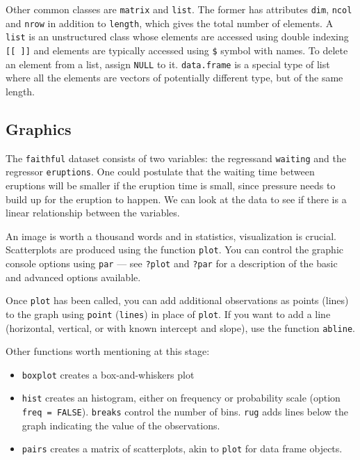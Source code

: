 \documentclass[]{book}
\providecommand{\tightlist}{%
  \setlength{\itemsep}{0pt}\setlength{\parskip}{0pt}}
\begin{document}
Other common classes are \texttt{matrix} and \texttt{list}. The former
has attributes \texttt{dim}, \texttt{ncol} and \texttt{nrow} in addition
to \texttt{length}, which gives the total number of elements. A
\texttt{list} is an unstructured class whose elements are accessed using
double indexing \texttt{{[}{[}\ {]}{]}} and elements are typically
accessed using \texttt{\$} symbol with names. To delete an element from
a list, assign \texttt{NULL} to it. \texttt{data.frame} is a special
type of list where all the elements are vectors of potentially different
type, but of the same length.

\subsection{Graphics}\label{graphics}

The \texttt{faithful} dataset consists of two variables: the regressand
\texttt{waiting} and the regressor \texttt{eruptions}. One could
postulate that the waiting time between eruptions will be smaller if the
eruption time is small, since pressure needs to build up for the
eruption to happen. We can look at the data to see if there is a linear
relationship between the variables.

An image is worth a thousand words and in statistics, visualization is
crucial. Scatterplots are produced using the function \texttt{plot}. You
can control the graphic console options using \texttt{par} --- see
\texttt{?plot} and \texttt{?par} for a description of the basic and
advanced options available.

Once \texttt{plot} has been called, you can add additional observations
as points (lines) to the graph using \texttt{point} (\texttt{lines}) in
place of \texttt{plot}. If you want to add a line (horizontal, vertical,
or with known intercept and slope), use the function \texttt{abline}.

Other functions worth mentioning at this stage:

\begin{itemize}
\tightlist
\item
  \texttt{boxplot} creates a box-and-whiskers plot
\item
  \texttt{hist} creates an histogram, either on frequency or probability
  scale (option \texttt{freq\ =\ FALSE}). \texttt{breaks} control the
  number of bins. \texttt{rug} adds lines below the graph indicating the
  value of the observations.
\item
  \texttt{pairs} creates a matrix of scatterplots, akin to \texttt{plot}
  for data frame objects.
\end{itemize}
\end{document}
